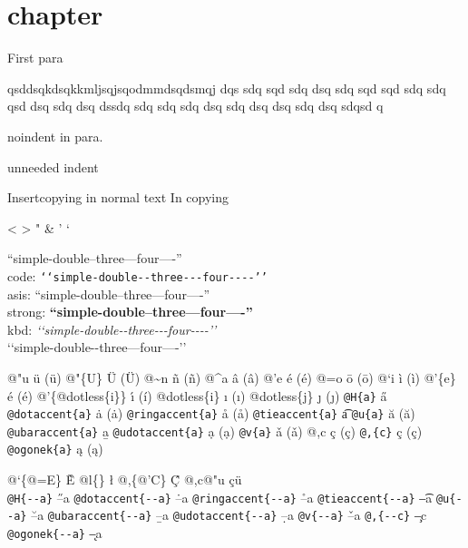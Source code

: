 \documentclass{book}
\newcommand\Texinfocommandstyletextkbd[1]{{\ttfamily\textsl{#1}}}%
\renewcommand{\_}{\Texinfounderscore\discretionary{}{}{}}
\begin{document}
\chapter{{chapter}}
\label{anchor:chapter}%

First para

\noindent{}qsddsqkdsqkkmljsqjsqodmmdsqdsmqj dqs sdq sqd sdq dsq sdq sqd sqd sdq sdq 
qsd dsq sdq dsq dssdq sdq sdq sdq dsq sdq dsq dsq sdq dsq sdqsd q

\noindent{}noindent in para.

unneeded indent

Insertcopying in normal text
In copying

<
>
"
\&
'
`

``simple-double--three---four----''\leavevmode{}\\
code: \texttt{{`}{`}simple-double{-}{-}three{-}{-}{-}four{-}{-}{-}-{'}{'}} \leavevmode{}\\
asis: ``simple-double--three---four----'' \leavevmode{}\\
strong: \textbf{``simple-double--three---four----''} \leavevmode{}\\
kbd: \Texinfocommandstyletextkbd{{`}{`}simple-double{-}{-}three{-}{-}{-}four{-}{-}{-}-{'}{'}} \leavevmode{}\\

`\hbox{}`simple-double-\hbox{}-three---four----'\hbox{}'\leavevmode{}\\

%
%
%
%

@"u \"{u} (ü)
@"\{U\} \"{U} (Ü) 
@\~{}n \~{n} (ñ)
@\^{}a \^{a} (â)
@'e \'{e} (é)
@=o \={o} (ō)
@`i \`{i} (ì)
@'\{e\} \'{e} (é)
@'\{@dotless\{i\}\} \'{\i{}} (í)
@dotless\{i\} \i{} (ı)
@dotless\{j\} \j{} (ȷ)
\texttt{@H\{a\}} \H{a}
\texttt{@dotaccent\{a\}} \.{a} (ȧ)
\texttt{@ringaccent\{a\}} \r{a} (å)
\texttt{@tieaccent\{a\}} \t{a}
\texttt{@u\{a\}} \u{a} (ă)
\texttt{@ubaraccent\{a\}} \b{a}
\texttt{@udotaccent\{a\}} \d{a} (ạ)
\texttt{@v\{a\}} \v{a} (ǎ)
@,c \c{c} (ç)
\texttt{@,\{c\}} \c{c} (ç)
\texttt{@ogonek\{a\}} \k{a} (ą)

@`\{@=E\} \`{\={E}}
@l\{\} \l{}
@,\{@'C\} \c{\'{C}}
@,c@"u \c{c}\"{u} \leavevmode{}\\

\texttt{@H\{{-}{-}a\}} \H{--a}
\texttt{@dotaccent\{{-}{-}a\}} \.{--a}
\texttt{@ringaccent\{{-}{-}a\}} \r{--a}
\texttt{@tieaccent\{{-}{-}a\}} \t{--a}
\texttt{@u\{{-}{-}a\}} \u{--a}
\texttt{@ubaraccent\{{-}{-}a\}} \b{--a}
\texttt{@udotaccent\{{-}{-}a\}} \d{--a}
\texttt{@v\{{-}{-}a\}} \v{--a}
\texttt{@,\{{-}{-}c\}} \c{--c}
\texttt{@ogonek\{{-}{-}a\}} \k{--a}
\end{document}
